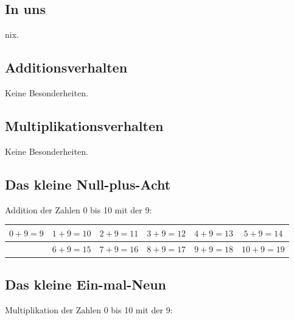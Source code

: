 \documentclass[a4paper]{amsart}
\theoremstyle{definition}
\begin{document}
\subsection{In uns}
nix.

\subsection{Additionsverhalten}
Keine Besonderheiten.

\subsection{Multiplikationsverhalten}
Keine Besonderheiten.

\subsection{Das kleine Null-plus-Acht}
Addition der Zahlen 0 bis 10 mit der 9:
\vspace{\kategoryVspace}

\begin{tabular}{|c|c|c|c|c|c|}
   \hline
   $0 + 9 = 9$ & $1 + 9 = 10$ & $2 + 9 = 11$ & $3 + 9 = 12$ & $4 + 9 = 13$ & $5 + 9 = 14$\\ 
   \hline
               & $6 + 9 = 15$ & $7 + 9 = 16$ & $8 + 9 = 17$ & $9 + 9 = 18$ & $10 + 9 = 19$ \\
   \hline
\end{tabular}

\subsection{Das kleine Ein-mal-Neun}
Multiplikation der Zahlen 0 bis 10 mit der 9:
\vspace{\kategoryVspace}
\end{document}
